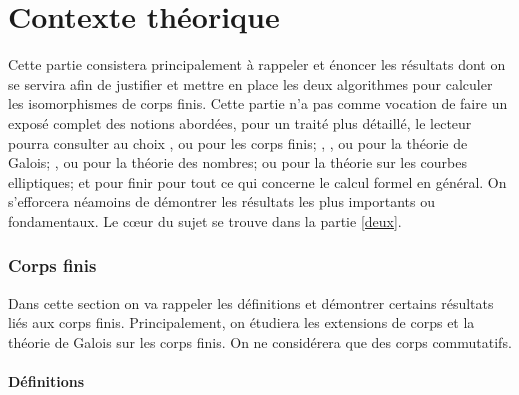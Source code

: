 \documentclass[a4paper]{article} %
\numberwithin{section}{part}
\numberwithin{equation}{section}
\begin{document}
\part{Contexte théorique}

Cette partie consistera principalement à rappeler et énoncer les résultats dont
on se servira afin de justifier et mettre en place les deux algorithmes pour
calculer les isomorphismes de corps finis. Cette partie n'a pas comme vocation
de faire un exposé complet des notions abordées, pour un traité plus détaillé,
le lecteur pourra consulter au choix \cite{LiNi1}, \cite{MuPa} ou 
\cite[chap.~III]{Per} pour les corps finis; \cite{Nek}, \cite[chap.~VIII]{Pol},
\cite[chap. VI]{Sam} ou \cite{Esc} pour la théorie de Galois; \cite{Sam}, 
\cite{Wash1} ou \cite{Lan} pour la théorie des nombres; \cite{Sil} ou 
\cite{Wash2} pour la théorie sur les courbes elliptiques; et pour finir 
\cite{GaGe} pour tout ce qui concerne le calcul formel en général. On 
s'efforcera néamoins de démontrer les résultats les plus importants ou 
fondamentaux. Le c\oe ur du sujet se trouve dans la partie \ref{deux}.

\section{Corps finis}
Dans cette section on va rappeler les définitions et démontrer certains 
résultats liés aux corps finis. Principalement, on étudiera les extensions 
de corps et la théorie de Galois sur les corps finis. On ne considérera
que des corps commutatifs.

\subsection{Définitions}
\end{document}
